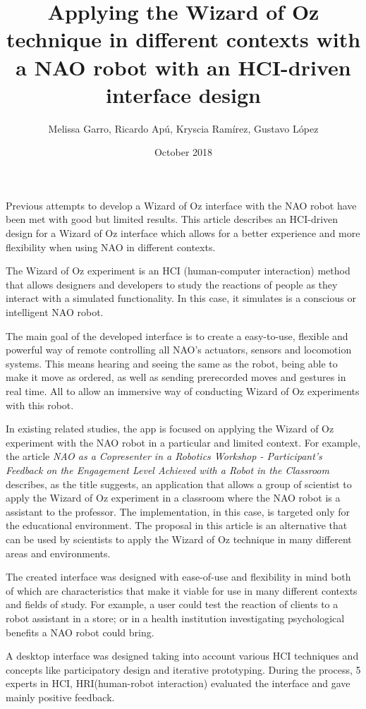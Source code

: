 \documentclass{article}
\title{Applying the Wizard of Oz technique in different contexts with a NAO robot with an HCI-driven interface design}
\author{Melissa Garro, Ricardo Apú, Kryscia Ramírez, Gustavo López}
\date{October 2018}
\begin{document}
\maketitle
    Previous attempts to develop a Wizard of Oz interface with the NAO robot have been met with good but limited results. This article describes an HCI-driven design for a Wizard of Oz interface which allows for a better experience and more flexibility when using NAO in different contexts.\par
    The Wizard of Oz experiment is an HCI (human-computer interaction) method that allows designers and developers to study the reactions of people as they interact with a simulated functionality\cite{wofoz}. In this case, it simulates is a conscious or intelligent NAO robot.\par
    The main goal of the developed interface is to create a easy-to-use, flexible and powerful way of remote controlling all NAO's actuators, sensors and locomotion systems. This means hearing and seeing the same as the robot, being able to make it move as ordered, as well as sending prerecorded moves and gestures in real time. All to allow an immersive way of conducting Wizard of Oz experiments with this robot.\par
    In existing related studies, the app is focused on applying the Wizard of Oz experiment with the NAO robot in a particular and limited context. For example, the article \textit{NAO as a Copresenter in a Robotics Workshop - Participant’s Feedback on the Engagement Level Achieved with a Robot in the Classroom}\cite{joseiby} describes, as the title suggests, an application that allows a group of scientist to apply the Wizard of Oz experiment in a classroom where the NAO robot is a assistant to the professor. The implementation, in this case, is targeted only for the educational environment. The proposal in this article is an alternative that can be used by scientists to apply the Wizard of Oz technique in many different areas and environments.\par
    The created interface was designed with ease-of-use and flexibility in mind both of which are characteristics that make it viable for use in many different contexts and fields of study. For example, a user could test the reaction of clients to a robot assistant in a store; or in a health institution investigating psychological benefits a NAO robot could bring.\par
    A desktop interface was designed taking into account various HCI techniques and concepts like participatory design and iterative prototyping. During the process, 5 experts in HCI, HRI(human-robot interaction) evaluated the interface and gave mainly positive feedback.\par
\end{document}
